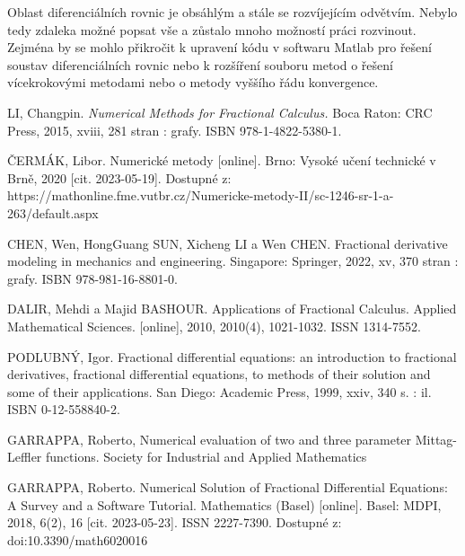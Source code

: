 \documentclass[a4paper,12pt,twoside]{article}
\theoremstyle{definition}
\theoremstyle{remark}
\numberwithin{equation}{section}
\numberwithin{table}{section}
\numberwithin{figure}{section}
\begin{document}
Oblast diferenciálních rovnic je obsáhlým a stále se rozvíjejícím odvětvím. Nebylo tedy zdaleka možné popsat vše a zůstalo mnoho možností práci rozvinout. Zejména by se mohlo přikročit k upravení kódu v softwaru Matlab pro řešení soustav diferenciálních rovnic nebo k rozšíření souboru metod o řešení vícekrokovými metodami nebo o metody vyššího řádu konvergence.


\newpage
\newpage
\begin{thebibliography}{12}
 LI, Changpin. {\em Numerical Methods for Fractional Calculus.} Boca Raton: CRC Press, 2015, xviii, 281 stran : grafy. ISBN 978-1-4822-5380-1.
	
 ČERMÁK, Libor. Numerické metody [online]. Brno: Vysoké učení technické v Brně, 2020 [cit. 2023-05-19]. Dostupné z: https://mathonline.fme.vutbr.cz/Numericke-metody-II/sc-1246-sr-1-a-263/default.aspx	
		

 CHEN, Wen, HongGuang SUN, Xicheng LI a Wen CHEN. Fractional derivative modeling in mechanics and engineering. Singapore: Springer, 2022, xv, 370 stran : grafy. ISBN 978-981-16-8801-0.

DALIR, Mehdi a Majid BASHOUR. Applications of Fractional Calculus. Applied Mathematical Sciences. [online], 2010, 2010(4), 1021-1032. ISSN 1314-7552.


PODLUBNÝ, Igor. Fractional differential equations: an introduction to fractional derivatives, fractional differential equations, to methods of their solution and some of their applications. San Diego: Academic Press, 1999, xxiv, 340 s. : il. ISBN 0-12-558840-2.

 GARRAPPA, Roberto, Numerical evaluation of two and three parameter Mittag-Leffler functions. Society for Industrial and Applied Mathematics

 GARRAPPA, Roberto. Numerical Solution of Fractional Differential Equations: A Survey and a Software Tutorial. Mathematics (Basel) [online]. Basel: MDPI, 2018, 6(2), 16 [cit. 2023-05-23]. ISSN 2227-7390. Dostupné z: doi:10.3390/math6020016


\end{thebibliography}
\end{document}
